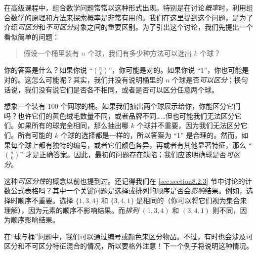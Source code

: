 在高级课程中，组合数学问题常常以这种形式出现。特别是在讨论\emph{概率}时，利用组合数学的原理和方法来探索概率是非常有用的。我们在这里提到这个问题，是为了介绍\emph{可区分}和\emph{不可区分}对象之间的重要区别。为了引出这个讨论，我们先提出一个看似简单的问题：
\begin{quotation}
    假设一个桶里装有 $n$ 个球，我们有多少种方法可以选出 $k$ 个球？
\end{quotation}
你的答案是什么？如果你说 ``${n \choose k}$''，你可能是对的。如果你说 ``$1$''，你也可能是对的。这怎么可能呢？其实，我们并没有说明桶里的 $n$ 个球是否\emph{可以区分}；换句话说，我们没有说它们是否各不相同，或者是否可以区分任意两个球。

想象一个装有 $100$ 个网球的桶。如果我们抽出两个球展示给你，你能区分它们吗？也许它们的黄色绒毛数量不同，或者品牌不同……但也可能我们无法区分它们。如果所有的球完全相同，那么抽出哪 $k$ 个球并不重要，因为我们无法区分它们。所有可能的 $k$ 个球的选择都是一样的，所以答案为 ``1'' 是合理的。然而，如果每个球上都有独特的编号，或者它们颜色各异，再或者有其他显著特征，那么 ``${n \choose k}$'' 才是正确答案。因此，最初的问题存在缺陷；我们应该明确球是否\emph{可区分}。

这种\emph{可区分性}的概念以前也提到过。还记得我们在 \ref{sec:section8.2.3} 节中讨论的计数公式表格吗？其中一个关键问题是选择或排列的顺序是否会\emph{影响}结果。例如，选择时顺序不重要。选择 $\{1, 3, 4\}$ 和 $\{3, 4, 1\}$ 是相同的（你可以将它们视为集合来理解），因为元素的顺序不影响结果。而\emph{排列} $(1, 3, 4)$ 和 $(3, 4, 1)$ 则不同，因为顺序影响结果。

在``球与桶''问题中，我们可以通过编号或颜色来区分物品。不过，有时也会涉及可区分和不可区分特征混合的情况，所以要格外注意！下一个例子将说明这种情况。

